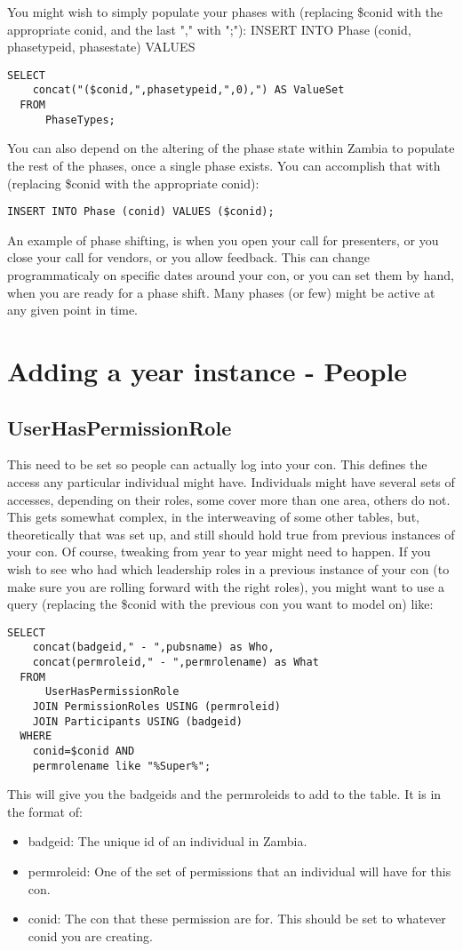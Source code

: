 \documentclass[captions=tablesignature]{scrartcl}
\begin{document}
You might wish to simply populate your phases with (replacing
\$conid with the appropriate conid, and the last "," with ";"):
INSERT INTO Phase (conid, phasetypeid, phasestate) VALUES
\begin{verbatim}
SELECT
    concat("($conid,",phasetypeid,",0),") AS ValueSet
  FROM
      PhaseTypes;
\end{verbatim}
You can also depend on the altering of the phase state within
Zambia to populate the rest of the phases, once a single phase
exists. You can accomplish that with (replacing \$conid with the
appropriate conid):
\begin{verbatim}
INSERT INTO Phase (conid) VALUES ($conid);
\end{verbatim}

An example of phase shifting, is when you open your call for
presenters, or you close your call for vendors, or you allow
feedback.  This can change programmaticaly on specific dates around
your con, or you can set them by hand, when you are ready for a
phase shift.  Many phases (or few) might be active at any given
point in time.

\section{Adding a year instance - People}
\label{sec-11}
\subsection{UserHasPermissionRole}
\label{sec-11-1}
This need to be set so people can actually log into your con.  This
defines the access any particular individual might have.
Individuals might have several sets of accesses, depending on their
roles, some cover more than one area, others do not.  This gets
somewhat complex, in the interweaving of some other tables, but,
theoretically that was set up, and still should hold true from
previous instances of your con.  Of course, tweaking from year to
year might need to happen.  If you wish to see who had which
leadership roles in a previous instance of your con (to make sure
you are rolling forward with the right roles), you might want to
use a query (replacing the \$conid with the previous con you want to
model on) like:
\begin{verbatim}
SELECT
    concat(badgeid," - ",pubsname) as Who,
    concat(permroleid," - ",permrolename) as What
  FROM
      UserHasPermissionRole
    JOIN PermissionRoles USING (permroleid)
    JOIN Participants USING (badgeid)
  WHERE
    conid=$conid AND
    permrolename like "%Super%";
\end{verbatim}
This will give you the badgeids and the permroleids to add to the
table.  It is in the format of:
\begin{itemize}
\item badgeid: The unique id of an individual in Zambia.
\item permroleid: One of the set of permissions that an individual will
have for this con.
\item conid: The con that these permission are for.  This should be set
to whatever conid you are creating.
\end{itemize}
\end{document}

